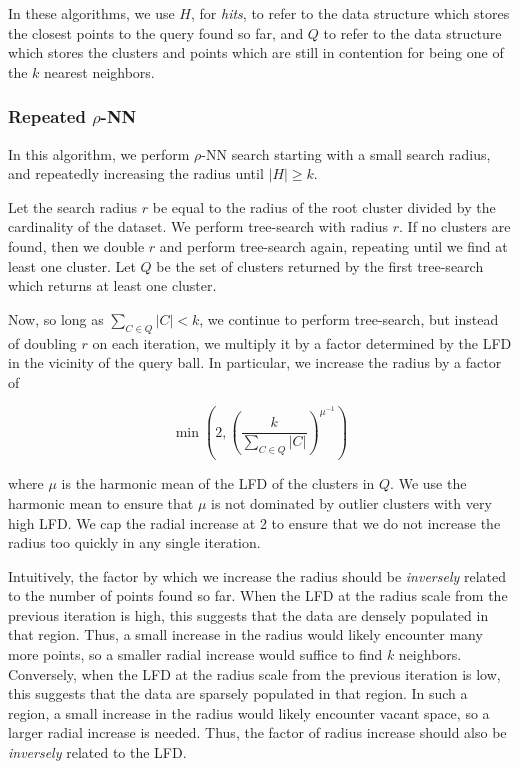 In these algorithms, we use $H$, for \textit{hits}, to refer to the data structure which stores the closest points to the query found so far, and $Q$ to refer to the data structure which stores the clusters and points which are still in contention for being one of the $k$ nearest neighbors.


\subsubsection{Repeated \texorpdfstring{$\rho$}{p}-NN}
\label{sec:methods:knn-search:repeated-rnn}

In this algorithm, we perform $\rho$-NN search starting with a small search radius, and repeatedly increasing the radius until $|H| \geq k$.

Let the search radius $r$ be equal to the radius of the root cluster divided by the cardinality of the dataset.
We perform tree-search with radius $r$.
If no clusters are found, then we double $r$ and perform tree-search again, repeating until we find at least one cluster.
Let $Q$ be the set of clusters returned by the first tree-search which returns at least one cluster.

Now, so long as $\sum_{C \in Q} |C| < k$, we continue to perform tree-search, but instead of doubling $r$ on each iteration, we multiply it by a factor determined by the LFD in the vicinity of the query ball. 
In particular, we increase the radius by a factor of

\begin{equation}
    \min \left(2, \left( {\frac{k}{\sum_{C \in Q} |C|}} \right)^{\mu^{-1}} \right)
    \label{eq:methods:repeated-rnn-factor}
\end{equation}

where $\mu$ is the harmonic mean of the LFD of the clusters in $Q$.
We use the harmonic mean to ensure that $\mu$ is not dominated by outlier clusters with very high LFD.
We cap the radial increase at 2 to ensure that we do not increase the radius too quickly in any single iteration.

Intuitively, the factor by which we increase the radius should be \textit{inversely} related to the number of points found so far. 
When the LFD at the radius scale from the previous iteration is high, this suggests that the data are densely populated in that region.
Thus, a small increase in the radius would likely encounter many more points, so a smaller radial increase would suffice to find $k$ neighbors.
Conversely, when the LFD at the radius scale from the previous iteration is low, this suggests that the data are sparsely populated in that region.
In such a region, a small increase in the radius would likely encounter vacant space, so a larger radial increase is needed.
Thus, the factor of radius increase should also be \textit{inversely} related to the LFD.

